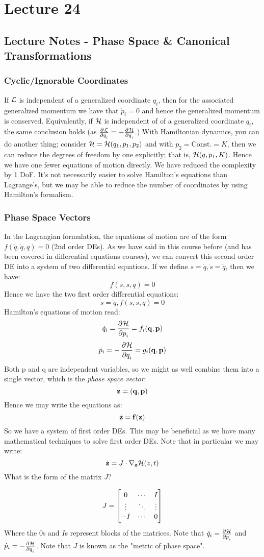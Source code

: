 \section{Lecture 24}
\subsection{Lecture Notes - Phase Space \& Canonical Transformations}
\subsubsection{Cyclic/Ignorable Coordinates}
If $\mathcal{L}$ is independent of a generalized coordinate $q_i$, then for the associated generalized momentum we have that $\dot{p}_i = 0$ and hence the generalized momentum is conserved. Equivalently, if $\mathcal{H}$ is independent of of a generalized coordinate $q_i$, the same conclusion holds (as $\pd{\LL}{q_i} = -\pd{\HH}{q_i}$.) With Hamiltonian dynamics, you can do another thing; consider $\mathcal{H} = \mathcal{H}(q_1, p_1, p_2)$ and with $p_2 = \text{Const.} = K$, then we can reduce the degrees of freedom by one explicitly; that is, $\mathcal{H}(q, p_1, K)$. Hence we have one fewer equations of motion directly. We have reduced the complexity by 1 DoF. It's not necessarily easier to solve Hamilton's equations than Lagrange's, but we may be able to reduce the number of coordinates by using Hamilton's formalism.

\subsubsection{Phase Space Vectors}
In the Lagrangian formulation, the equations of motion are of the form $f(\ddot{q}, \dot{q}, q) = 0$ (2nd order DEs). As we have said in this course before (and has been covered in differential equations courses), we can convert this second order DE into a system of two differential equations. If we define $s = \dot{q}, \dot{s} = \ddot{q}$, then we have:
\[f(\dot{s}, s, q) = 0\]
Hence we have the two first order differential equations:
\[\dot{s} = \ddot{q}, f(\dot{s}, s, q) = 0\]
Hamilton's equations of motion read:
\[\dot{q}_i = \dpd{\HH}{p_i} = f_i(\v{q}, \v{p})\]
\[\dot{p}_i = -\dpd{\HH}{q_i} = g_i(\v{q}, \v{p})\]
Both p and q are independent variables, so we might as well combine them into a single vector, which is the \textit{phase space vector}:
\[\mathbf{z} = (\mathbf{q}, \mathbf{p})\]
Hence we may write the equations as:
\[\dot{\mathbf{z}} = \mathbf{f}(\mathbf{z})\]
So we have a system of first order DEs. This may be beneficial as we have many mathematical techniques to solve first order DEs. Note that in particular we may write:
\[\dot{\mathbf{z}} = J \cdot \nabla_{\mathbf{z}}\mathcal{H}(z, t)\]
What is the form of the matrix $J$?
\begin{s}
\[J = \begin{bmatrix}0 & \cdots & I \\ \vdots & \ddots & \vdots \\ -I & \cdots & 0\end{bmatrix}\]
Where the $0$s and $I$s represent blocks of the matrices. Note that $\dot{q}_i = \pd{\HH}{p_i}$ and $\dot{p}_i = - \pd{\HH}{q_i}$. Note that $J$ is known as the "metric of phase space". 
\end{s}

